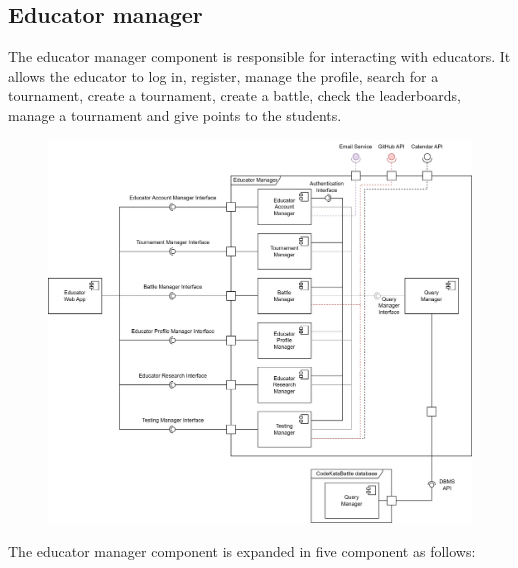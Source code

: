 \documentclass[12pt, a4paper]{report}
\begin{document}
    \subsection{Educator manager}
    The educator manager component is responsible for interacting with educators.
    It allows the educator to log in, register, manage the profile, search for a tournament, create a tournament, create a battle, check the leaderboards, manage a tournament and give points to the students. 
    \begin{figure}[H]
        \centering
        \includegraphics[width=0.8\linewidth]{images/component_view_educator.png}
    \end{figure}
    The educator manager component is expanded in five component as follows: 
\end{document}
